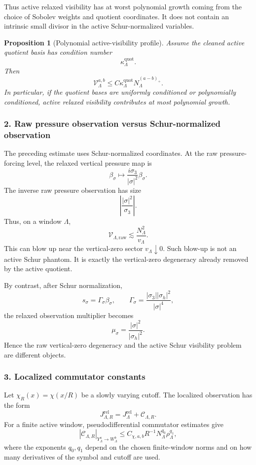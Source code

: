 \documentclass[11pt]{article}
\numberwithin{equation}{section}
\newtheorem{proposition}[theorem]{Proposition}
\begin{document}
Thus active relaxed visibility has at worst polynomial growth coming from the choice of Sobolev weights and quotient coordinates. It does not contain an intrinsic small divisor in the active Schur-normalized variables.

\begin{proposition}[Polynomial active-visibility profile]
Assume the cleaned active quotient basis has condition number
\[
\kappa_\Lambda^{\mathrm{quot}}.
\]
Then
\[
\mathcal V_\Lambda^{a,b}
\le
C\kappa_\Lambda^{\mathrm{quot}}N_\Lambda^{(a-b)_+}.
\]
In particular, if the quotient bases are uniformly conditioned or polynomially conditioned, active relaxed visibility contributes at most polynomial growth.
\end{proposition}

\subsubsection*{2. Raw pressure observation versus Schur-normalized observation}

The preceding estimate uses Schur-normalized coordinates. At the raw pressure-forcing level, the relaxed vertical pressure map is
\[
\beta_\sigma
\longmapsto
\frac{i\sigma_3}{|\sigma|^2}\beta_\sigma.
\]
The inverse raw pressure observation has size
\[
\left|
\frac{|\sigma|^2}{\sigma_3}
\right|.
\]
Thus, on a window \(\Lambda\),
\[
\mathcal V_{\Lambda,\mathrm{raw}}
\lesssim
\frac{N_\Lambda^2}{v_\Lambda}.
\]
This can blow up near the vertical-zero sector \(v_\Lambda\downarrow0\). Such blow-up is not an active Schur phantom. It is exactly the vertical-zero degeneracy already removed by the active quotient.

By contrast, after Schur normalization,
\[
s_\sigma=\Gamma_\sigma\beta_\sigma,
\qquad
\Gamma_\sigma =
\frac{|\sigma_3||\sigma_h|^2}{|\sigma|^4},
\]
the relaxed observation multiplier becomes
\[
\mu_\sigma =
\frac{|\sigma|^2}{|\sigma_h|^2}.
\]
Hence the raw vertical-zero degeneracy and the active Schur visibility problem are different objects.

\subsubsection*{3. Localized commutator constants}

Let \(\chi_R(x)=\chi(x/R)\) be a slowly varying cutoff. The localized observation has the form
\[
J_{\Lambda,R}^{\mathrm{rel}} =
J_\Lambda^{\mathrm{rel}}
+
\mathcal C_{\Lambda,R}.
\]
For a finite active window, pseudodifferential commutator estimates give
\[
|\mathcal C_{\Lambda,R}|_{Y_\Lambda^a\to W_\Lambda^b}
\le
C_{\chi,a,b}
R^{-1}
N_\Lambda^{q_0}
\rho_\Lambda^{q_1},
\]
where the exponents \(q_0,q_1\) depend on the chosen finite-window norms and on how many derivatives of the symbol and cutoff are used.
\end{document}
